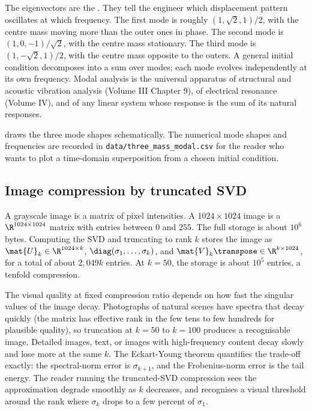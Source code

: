 The eigenvectors are the . They tell the
engineer which displacement pattern oscillates at which frequency.
The first mode is roughly $(1, \sqrt{2}, 1)/2$, with the centre
mass moving more than the outer ones in phase. The second mode is
$(1, 0, -1)/\sqrt{2}$, with the centre mass stationary. The third
mode is $(1, -\sqrt{2}, 1)/2$, with the centre mass opposite to the
outers. A general initial condition decomposes into a sum over
modes; each mode evolves independently at its own frequency. Modal
analysis is the universal apparatus of structural and acoustic
vibration analysis (Volume III Chapter 9), of electrical resonance
(Volume IV), and of any linear system whose response is the sum of
its natural responses.



 draws the three mode shapes
schematically. The numerical mode shapes and frequencies are recorded
in \texttt{data/three\_mass\_modal.csv} for the reader who wants to
plot a time-domain superposition from a chosen initial condition.

\subsection{Image compression by truncated SVD}

A grayscale image is a matrix of pixel intensities. A
$1024 \times 1024$ image is a $\R^{1024 \times 1024}$ matrix
with entries between $0$ and $255$. The full storage is about
$10^{6}$ bytes. Computing the SVD and truncating to rank $k$ stores
the image as $\mat{U}_{k} \in \R^{1024 \times k}$,
$\diag(\sigma_{1}, \ldots, \sigma_{k})$, and $\mat{V}_{k}\transpose
\in \R^{k \times 1024}$, for a total of about $2{,}049 k$ entries.
At $k = 50$, the storage is about $10^{5}$ entries, a tenfold
compression.

The visual quality at fixed compression ratio depends on how fast
the singular values of the image decay. Photographs of natural
scenes have spectra that decay quickly (the matrix has effective
rank in the few tens to few hundreds for plausible quality), so
truncation at $k = 50$ to $k = 100$ produces a recognisable image.
Detailed images, text, or images with high-frequency content decay
slowly and lose more at the same $k$. The Eckart-Young theorem
quantifies the trade-off exactly: the spectral-norm error is
$\sigma_{k+1}$, and the Frobenius-norm error is the tail energy.
The reader running the truncated-SVD compression sees the
approximation degrade smoothly as $k$ decreases, and recognises a
visual threshold around the rank where $\sigma_{k}$ drops to a few
percent of $\sigma_{1}$.

